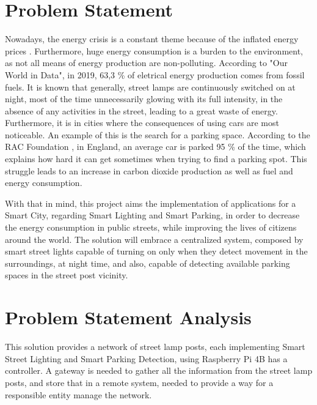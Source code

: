 \section{Problem Statement}
Nowadays, the energy crisis is a constant theme because of the inflated energy prices \cite{energy_crisis}. Furthermore, huge energy consumption is a burden to the environment, as not all means of energy production are non-polluting. According to "Our World in Data"\cite{owidenergy}, in 2019, 63,3 \% of eletrical energy production comes from fossil fuels. It is known that generally, street lamps are continuously switched on at night, most of the time unnecessarily glowing with its full intensity, in the absence of any activities in the street, leading to a great waste of energy. Furthermore, it is in cities where the consequences of using cars are most noticeable. An example of this is the search for a parking space. According to the RAC Foundation \cite{cars_parked}, in England, an average car is parked 95 \% of the time, which explains how hard it can get sometimes when trying to find a parking spot. This struggle leads to an increase in carbon dioxide production as well as fuel and energy consumption.

With that in mind, this project aims the implementation of applications for a Smart City, regarding Smart Lighting and Smart Parking, in order to decrease the energy consumption in public streets, while improving the lives of citizens around the world. The solution will embrace a centralized system, composed by smart street lights capable of turning on only when they detect movement in the surroundings, at night time, and also, capable of detecting available parking spaces in the street post vicinity.

\clearpage
\section{Problem Statement Analysis}
This solution provides a network of street lamp posts, each implementing Smart Street Lighting and Smart Parking Detection, using Raspberry Pi 4B \cite{rasp_pi} has a controller. A gateway is needed to gather all the information from the street lamp posts, and store that in a remote system, needed to provide a way for a responsible entity manage the network.


